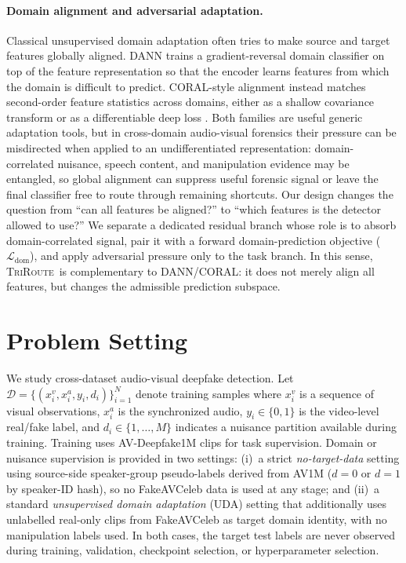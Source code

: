 \documentclass{article}
\newcommand{\method}{\textsc{TriRoute}}
\begin{document}
\paragraph{Domain alignment and adversarial adaptation.}
Classical unsupervised domain adaptation often tries to make source and target features globally aligned. DANN \citep{ganin2016dann} trains a gradient-reversal domain classifier on top of the feature representation so that the encoder learns features from which the domain is difficult to predict. CORAL-style alignment instead matches second-order feature statistics across domains, either as a shallow covariance transform or as a differentiable deep loss \citep{sun2016deepcoral}. Both families are useful generic adaptation tools, but in cross-domain audio-visual forensics their pressure can be misdirected when applied to an undifferentiated representation: domain-correlated nuisance, speech content, and manipulation evidence may be entangled, so global alignment can suppress useful forensic signal or leave the final classifier free to route through remaining shortcuts. Our design changes the question from ``can all features be aligned?'' to ``which features is the detector allowed to use?'' We separate a dedicated residual branch whose role is to absorb domain-correlated signal, pair it with a forward domain-prediction objective ($\mathcal{L}_{\mathrm{dom}}$), and apply adversarial pressure only to the task branch. In this sense, \method\ is complementary to DANN/CORAL: it does not merely align all features, but changes the admissible prediction subspace.

\section{Problem Setting}

We study cross-dataset audio-visual deepfake detection. Let $\mathcal{D} = \{(x_i^v, x_i^a, y_i, d_i)\}_{i=1}^N$ denote training samples where $x_i^v$ is a sequence of visual observations, $x_i^a$ is the synchronized audio, $y_i \in \{0,1\}$ is the video-level real/fake label, and $d_i \in \{1,\dots,M\}$ indicates a nuisance partition available during training. Training uses AV-Deepfake1M clips for task supervision. Domain or nuisance supervision is provided in two settings: (i)~a strict \emph{no-target-data} setting using source-side speaker-group pseudo-labels derived from AV1M ($d=0$ or $d=1$ by speaker-ID hash), so no FakeAVCeleb data is used at any stage; and (ii)~a standard \emph{unsupervised domain adaptation} (UDA) setting that additionally uses unlabelled real-only clips from FakeAVCeleb as target domain identity, with no manipulation labels used. In both cases, the target test labels are never observed during training, validation, checkpoint selection, or hyperparameter selection.
\end{document}
